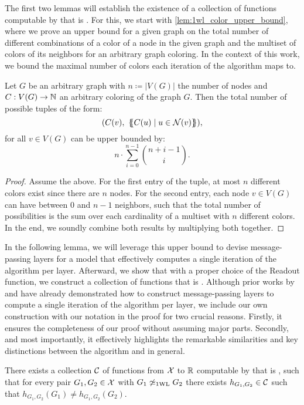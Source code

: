 The first two lemmas will establish the existence of a collection of functions computable by \gnns that is \wldisc. For this, we start with \cref{lem:1wl_color_upper_bound}, where we prove an upper bound for a given graph on the total number of different combinations of a color of a node in the given graph and the multiset of colors of its neighbors for an arbitrary graph coloring. In the context of this work, we bound the maximal number of colors each iteration of the \wl algorithm maps to. 
\begin{lemma}\label{lem:1wl_color_upper_bound}
    Let $G$ be an arbitrary graph with $n \coloneqq |V(G)|$ the number of nodes and $C: V(G) \rightarrow \mathbb{N}$ an arbitrary coloring of the graph $G$. Then the total number of possible tuples of the form:
    \begin{equation*}
        (C(v), \ \{\!\!\{ C(u) \mid u \in \mathcal{N}(v) \}\!\!\}),
    \end{equation*}
    for all $v \in V(G)$ can be upper bounded by:
    \begin{equation*}
        n \cdot \sum_{i=0}^{n-1} \binom{n+i -1}{i}.
    \end{equation*}
\end{lemma}
\begin{proof}
    Assume the above. For the first entry of the tuple, at most $n$ different colors exist since there are $n$ nodes. For the second entry, each node $v \in V(G)$ can have between $0$ and $n-1$ neighbors, such that the total number of possibilities is the sum over each cardinality of a multiset with $n$ different colors. In the end, we soundly combine both results by multiplying both together.
\end{proof}

In the following lemma, we will leverage this upper bound to devise message-passing layers for a \gnn model that effectively computes a single iteration of the \wl algorithm per layer. Afterward, we show that with a proper choice of the \textsf{Readout} function, we construct a collection of \gnn functions that is \wldisc. Although prior works by \cite{Morris2018} and \cite{Xu2018} have already demonstrated how to construct message-passing layers to compute a single iteration of the \wl algorithm per layer, we include our own construction with our notation in the proof for two crucial reasons. Firstly, it ensures the completeness of our proof without assuming major parts. Secondly, and most importantly, it effectively highlights the remarkable similarities and key distinctions between the \wl algorithm and \gnns in general.
\begin{lemma}\label{lem:gnn_1wl_disc}
    There exists a collection $\mathcal{C}$ of functions from $\mathcal{X}$ to $\mathbb{R}$ computable by \gnns that is \wldisc, such that for every pair $G_1, G_2 \in \mathcal{X}$ with $G_1 \not\simeq_{\text{1WL}} G_2$ there exists $h_{G_1, G_2} \in \mathcal{C}$ such that $h_{G_1, G_2}(G_1) \neq h_{G_1, G_2}(G_2)$.
\end{lemma}

